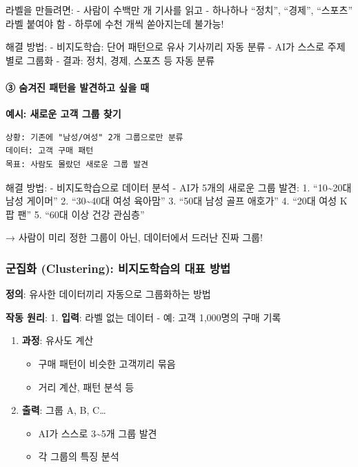 \documentclass[a4paper, 11pt]{article}
\providecommand{\tightlist}{%
  \setlength{\itemsep}{0pt}\setlength{\parskip}{0pt}}
\begin{document}
라벨을 만들려면: - 사람이 수백만 개 기사를 읽고 - 하나하나 ``정치'',
``경제'', ``스포츠'' 라벨 붙여야 함 - 하루에 수천 개씩 쏟아지는데
불가능!

해결 방법: - 비지도학습: 단어 패턴으로 유사 기사끼리 자동 분류 - AI가
스스로 주제별로 그룹화 - 결과: 정치, 경제, 스포츠 등 자동 분류

\hypertarget{uxc228uxaca8uxc9c4-uxd328uxd134uxc744-uxbc1cuxacacuxd558uxace0-uxc2f6uxc744-uxb54c}{%
\paragraph{\textbf{③} 숨겨진 패턴을 발견하고 싶을
때}\label{uxc228uxaca8uxc9c4-uxd328uxd134uxc744-uxbc1cuxacacuxd558uxace0-uxc2f6uxc744-uxb54c}}

\textbf{예시: 새로운 고객 그룹 찾기}

\begin{verbatim}
상황: 기존에 "남성/여성" 2개 그룹으로만 분류
데이터: 고객 구매 패턴
목표: 사람도 몰랐던 새로운 그룹 발견
\end{verbatim}

해결 방법: - 비지도학습으로 데이터 분석 - AI가 5개의 새로운 그룹 발견:
1. ``10\textasciitilde20대 남성 게이머'' 2. ``30\textasciitilde40대 여성
육아맘'' 3. ``50대 남성 골프 애호가'' 4. ``20대 여성 K팝 팬'' 5. ``60대
이상 건강 관심층''

→ 사람이 미리 정한 그룹이 아닌, 데이터에서 드러난 진짜 그룹!

\hypertarget{uxad70uxc9d1uxd654-clustering-uxbe44uxc9c0uxb3c4uxd559uxc2b5uxc758-uxb300uxd45c-uxbc29uxbc95}{%
\subsubsection{군집화 (Clustering): 비지도학습의 대표
방법}\label{uxad70uxc9d1uxd654-clustering-uxbe44uxc9c0uxb3c4uxd559uxc2b5uxc758-uxb300uxd45c-uxbc29uxbc95}}

\textbf{정의}: 유사한 데이터끼리 자동으로 그룹화하는 방법

\textbf{작동 원리}: 1. \textbf{입력}: 라벨 없는 데이터 - 예: 고객
1,000명의 구매 기록

\begin{enumerate}
\def\labelenumi{\arabic{enumi}.}
\setcounter{enumi}{1}
\tightlist
\item
  \textbf{과정}: 유사도 계산

  \begin{itemize}
  \tightlist
  \item
    구매 패턴이 비슷한 고객끼리 묶음
  \item
    거리 계산, 패턴 분석 등
  \end{itemize}
\item
  \textbf{출력}: 그룹 A, B, C\ldots{}

  \begin{itemize}
  \tightlist
  \item
    AI가 스스로 3\textasciitilde5개 그룹 발견
  \item
    각 그룹의 특징 분석
  \end{itemize}
\end{enumerate}
\end{document}
